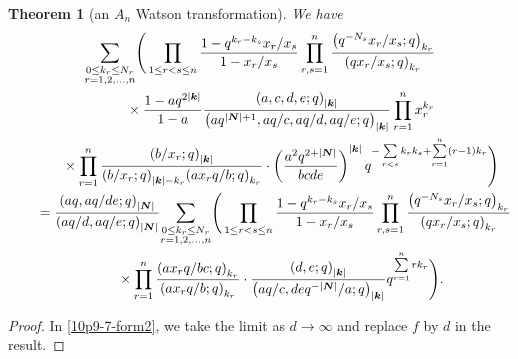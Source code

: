 \documentclass[pdftex]{sigma}
\numberwithin{equation}{section}
\newtheorem{Theorem}{Theorem}[section]
\newcommand{\sumN}{{\left| \boldsymbol{N} \right|}}
\newcommand\sumk{{\left| \boldsymbol{k} \right|}}
\newcommand{\multsum}[3]{{\sum\limits_{\substack{{0\le #1_#3 \le #2_#3} \\
{#3 =1,2,\dots, n}}}}}
\newcommand{\qrfac}[2]{{\left({#1}; q\right)_{#2}}} %
\newcommand{\triprod}[1]{\prod\limits_{1\le r < s \le #1}}
\newcommand{\sqprod}[1]{\prod\limits_{r, s =1}^{#1}} %
\newcommand{\smallprod}[1]{\prod\limits_{r =1}^{#1}} %
\newcommand{\xover}[1]{#1_{r}/#1_{s}}
\newcommand{\vandermonde}[3]{\triprod{#3} %
 \frac{1-q^{#2_r-#2_s} \xover {#1} }{1-\xover{#1}}
}
\begin{document}
\begin{Theorem}[an $A_n$ Watson transformation] We have
\begin{gather*}
\multsum{k}{N}{r} \Bigg( \vandermonde{x}{k}{n}
\sqprod n \frac{\qrfac{q^{-N_s}\xover{x}}{k_r} }{\qrfac{q\xover{x}}{k_r} } \notag \\
\qquad\quad{} \times \frac{1-aq^{2\sumk}}{1-a}
 \frac{\qrfac{a, c, d, e}{\sumk}}{\qrfac{aq^{\sumN+1}, aq/c, aq/d, aq/e}{\sumk}}
 \smallprod n x_r^{k_r}\notag \\
\qquad\quad{} \times \smallprod n \frac{\qrfac{b/x_r}{\sumk}}{\qrfac{b/x_r}{\sumk-k_r} \qrfac{ax_rq/b}{k_r}}
\cdot \left(\frac{a^2q^{2+\sumN}}{bcde}\right)^{\sumk}
q^{- \sum\limits_{r<s}k_rk_s+\sum\limits_{r=1}^n (r-1)k_r }
 \Bigg)\notag \\
\qquad {}= \frac{\qrfac{aq, aq/de}{\sumN}}{\qrfac{aq/d, aq/e}{\sumN}} \multsum{k}{N}{r} \Bigg(\vandermonde{x}{k}{n}
\sqprod n \frac{\qrfac{q^{-N_s}\xover{x}}{k_r} }{\qrfac{q\xover{x}}{k_r} } \notag \\
\qquad\quad{} \times \smallprod n \frac{\qrfac{ax_rq/bc}{k_r}}
{ \qrfac{ax_rq/b}{k_r}} \cdot \frac{\qrfac{ d, e}{\sumk}}{\qrfac{aq/c, deq^{-\sumN}/a}{\sumk} }
q^{\sum\limits_{r=1}^n rk_r } \Bigg). %
\end{gather*}
\end{Theorem}
\begin{proof}In \eqref{10p9-7-form2}, we take the limit as $d\to \infty$ and replace $f$ by $d$ in the result.
\end{proof}
\end{document}
